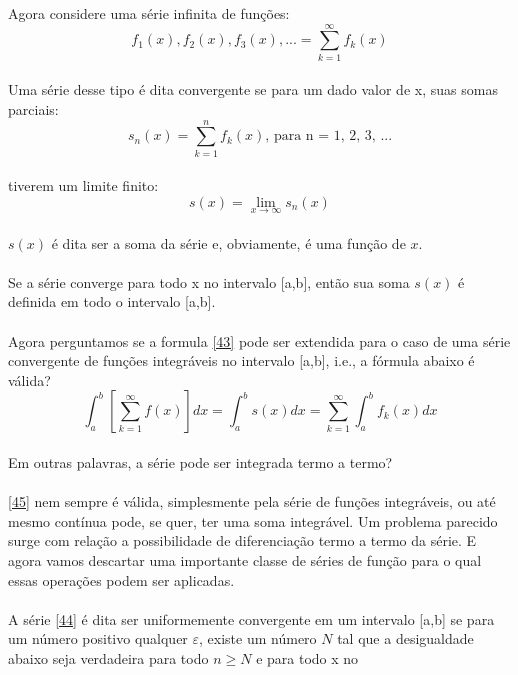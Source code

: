 \documentclass{article}
\begin{document}
Agora considere uma série infinita de funções:\\
\begin{equation}
\label{44}
    f_1(x), f_2(x), f_3(x), ... = \sum\limits_{k=1}^{\infty}f_k(x)
\end{equation}
\\
Uma série desse tipo é dita convergente se para um dado valor de x,
suas somas parciais:\\
\begin{equation}
    s_n(x) = \sum\limits_{k=1}^{n}f_k(x)\text{, para n = 1, 2, 3, ...}
\end{equation}
\\
tiverem um limite finito:\\
\begin{equation}
    s(x) = \lim_{x\to\infty} s_n(x)
\end{equation}
\\
$s(x)$ é dita ser a soma da série e, obviamente, é uma função de $x$.\\
\\
Se a série converge para todo x no intervalo [a,b], então sua soma $s(x)$
é definida em todo o intervalo [a,b].\\
\\
Agora perguntamos se a formula \ref{43} pode ser extendida para o caso de 
uma série convergente de funções integráveis no intervalo [a,b], i.e.,
a fórmula abaixo é válida?\\
\begin{equation}
\label{45}
    \int_{a}^{b}[\sum\limits_{k=1}^{\infty}f(x)]dx = \int_{a}^{b}s(x) dx = \sum\limits_{k=1}^{\infty}\int_{a}^{b}f_k(x) dx
\end{equation}
\\
Em outras palavras, a série pode ser integrada termo a termo?\\
\\
\ref{45} nem sempre é válida, simplesmente pela série de funções integráveis,
ou até mesmo contínua pode, se quer, ter uma soma integrável. Um problema parecido 
surge com relação a possibilidade de diferenciação termo a termo da série.
E agora vamos descartar uma importante classe de séries de função para o qual 
essas operações podem ser aplicadas.\\
\\
A série \ref{44} é dita ser uniformemente convergente em um intervalo [a,b] se
para um número positivo qualquer $\varepsilon$, existe um número $N$ tal que a
desigualdade abaixo seja verdadeira para todo $n \geq N$ e para todo x no 
\end{document}
